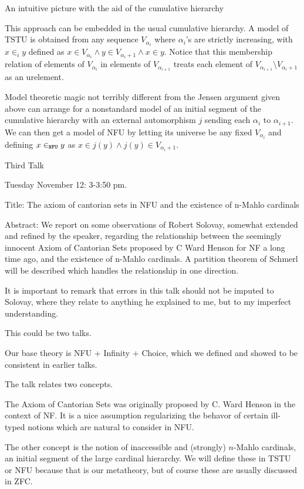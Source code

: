 \documentclass{slides}
\begin{document}
\begin{slide}

{\Large An intuitive picture with the aid of the cumulative hierarchy}

This approach can be embedded in the usual cumulative hierarchy.  A model of TSTU is obtained from any sequence $V_{\alpha_i}$ where $\alpha_i$'s are strictly increasing,
with $x \in_i y$ defined as $x \in V_{\alpha_i} \wedge y \in V_{\alpha_i+1} \wedge x \in y$.  Notice that this membership relation of elements of $V_{\alpha_i}$ in elements of
$V_{\alpha_{i+1}}$ treats each element of $V_{\alpha_{i+1}} \setminus V_{\alpha_i+1}$ as an urelement.

Model theoretic magic not terribly different from the Jensen argument given above can arrange for a nonstandard model of an initial segment of the cumulative hierarchy
with an external automorphism $j$ sending each $\alpha_i$ to $\alpha_{i+1}$.  We can then get a model of NFU by letting its universe be any fixed $V_{\alpha_i}$ and
defining $x \in_{\tt NFU} y$ as $x \in j(y) \wedge j(y) \in V_{\alpha_i+1}$.


\end{slide}

\begin{slide}

{\Large Third Talk}

Tuesday November 12:  3-3:50 pm.

Title:  The axiom of cantorian sets in NFU and the existence of n-Mahlo cardinals

Abstract:  We report on some observations of Robert Solovay, somewhat extended and refined by the speaker,
regarding the relationship between the seemingly innocent Axiom of Cantorian Sets proposed by
C Ward Henson for NF a long time ago, and the existence of n-Mahlo cardinals.  A partition theorem of
Schmerl will be described which handles the relationship in one direction.

It is important to remark that errors in this talk should not be imputed to Solovay, where they relate to anything he explained to me, but to my imperfect understanding.

This could be two talks.

\end{slide}

\begin{slide}

Our base theory is NFU + Infinity + Choice, which we defined and showed to be consistent in earlier talks.

The talk relates two concepts.

The Axiom of Cantorian Sets was originally proposed by C. Ward Henson in the context of NF.  It is a nice assumption regularizing the behavor of certain  ill-typed notions
which are natural to consider in NFU.

The other concept is the notion of inaccessible and (strongly) $n$-Mahlo cardinals, an initial segment of the large cardinal hierarchy.  We will define these in TSTU or NFU because 
that is our metatheory, but of course these are usually discussed in ZFC.

\end{slide}
\end{document}
